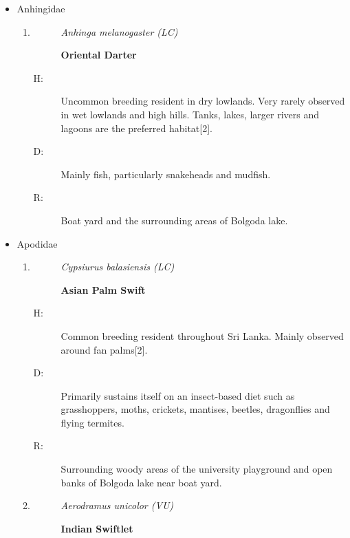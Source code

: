 \begin{itemize}
\begin{enumerate}
\begin{description}
\item[R: ]%
Boat yard and the surrounding areas of Bolgoda lake.%
\end{description}%
\end{enumerate}%
\item%
Anhingidae%
\begin{enumerate}%
\item%
\begin{description}%
\item[]%
\textit{Anhinga melanogaster (LC)}%
\item[]%
\textbf{Oriental Darter}%
\end{description}%
\begin{description}%
\item[H: ]%
Uncommon breeding resident in dry lowlands. Very rarely observed in wet lowlands and high hills. Tanks, lakes, larger rivers and lagoons are the preferred habitat{[}2{]}.%
\item[D: ]%
Mainly fish, particularly snakeheads and mudfish.%
\item[R: ]%
Boat yard and the surrounding areas of Bolgoda lake.%
\end{description}%
\end{enumerate}%
\item%
Apodidae%
\begin{enumerate}%
\item%
\begin{description}%
\item[]%
\textit{Cypsiurus balasiensis (LC)}%
\item[]%
\textbf{Asian Palm Swift}%
\end{description}%
\begin{description}%
\item[H: ]%
Common breeding resident throughout Sri Lanka. Mainly observed around fan palms{[}2{]}.%
\item[D: ]%
Primarily sustains itself on an insect{-}based diet such as grasshoppers, moths, crickets, mantises, beetles, dragonflies and flying termites.%
\item[R: ]%
Surrounding woody areas of the university playground and open banks of Bolgoda lake near boat yard.%
\end{description}%
\item%
\begin{description}%
\item[]%
\textit{Aerodramus unicolor (VU)}%
\item[]%
\textbf{Indian Swiftlet}%
\end{description}%

\end{enumerate}
\end{itemize}
